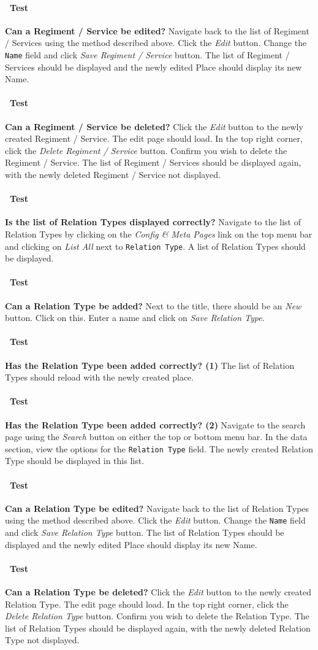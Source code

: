 \documentclass[12pt]{article}
\newcounter{Test}
\newcommand{\test}[1]{%
\stepcounter{Test}%
\paragraph{\Circle\ Test \theTest} \textbf{#1} }
\begin{document}
\test{Can a Regiment / Service be edited?}
Navigate back to the list of Regiment / Services using the method described above. Click the \textit{Edit} button. Change the \texttt{Name} field and click \textit{Save Regiment / Service} button. The list of Regiment / Services should be displayed and the newly edited Place should display its new Name.

\test{Can a Regiment / Service be deleted?}
Click the \textit{Edit} button to the newly created Regiment / Service. The edit page should load. In the top right corner, click the \textit{Delete Regiment / Service} button. Confirm you wish to delete the Regiment / Service. The list of Regiment / Services should be displayed again, with the newly deleted Regiment / Service not displayed.

\test{Is the list of Relation Types displayed correctly?}
Navigate to the list of Relation Types by clicking on the \textit{Config \& Meta Pages} link on the top menu bar and clicking on \textit{List All} next to \texttt{Relation Type}. A list of Relation Types should be displayed.

\test{Can a Relation Type be added?}
Next to the title, there should be an \textit{New} button. Click on this. Enter a name and click on \textit{Save Relation Type}.

\test{Has the Relation Type been added correctly? (1)}
The list of Relation Types should reload with the newly created place.

\test{Has the Relation Type been added correctly? (2)}
Navigate to the search page using the \textit{Search} button on either the top or bottom menu bar. In the data section, view the options for the \texttt{Relation Type} field. The newly created Relation Type should be displayed in this list.

\test{Can a Relation Type be edited?}
Navigate back to the list of Relation Types using the method described above. Click the \textit{Edit} button. Change the \texttt{Name} field and click \textit{Save Relation Type} button. The list of Relation Types should be displayed and the newly edited Place should display its new Name.

\test{Can a Relation Type be deleted?}
Click the \textit{Edit} button to the newly created Relation Type. The edit page should load. In the top right corner, click the \textit{Delete Relation Type} button. Confirm you wish to delete the Relation Type. The list of Relation Types should be displayed again, with the newly deleted Relation Type not displayed.
\end{document}
